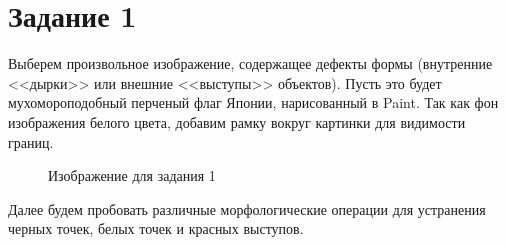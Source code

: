 \documentclass[a4paper, 12pt]{article}
\begin{document}
    \section{Задание 1}
    Выберем произвольное изображение, содержащее дефекты формы (внутренние <<дырки>> или внешние <<выступы>> объектов).
    Пусть это будет мухомороподобный перченый флаг Японии, нарисованный в Paint.
    Так как фон изображения белого цвета, добавим рамку вокруг картинки для видимости границ.
    \begin{figure}[H]
        \centering
        \captionsetup{skip=0pt}
        \caption{Изображение для задания 1}
        \label{fig:izt1}
    \end{figure}
    Далее будем пробовать различные морфологические операции для устранения черных точек, белых точек и красных выступов.
\end{document}
